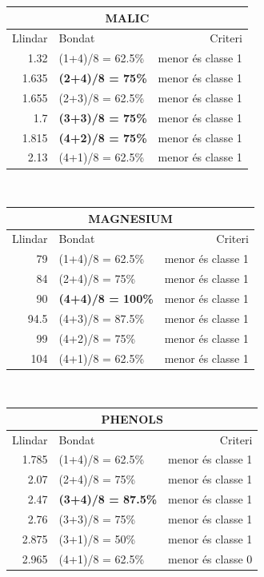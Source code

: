 \documentclass{article} %
\begin{document}
{	{\selectfont\small
	\begin{tabular}{r | l | r}
	 	\multicolumn{3}{c}{MALIC}  \\ \hline
	 	Llindar & Bondat & Criteri \\ \hline
		1.32  & (1+4)/8 = 62.5\% & menor és classe 1 \\
		1.635 & \textbf{(2+4)/8 = 75\%} & menor és classe 1 \\
		1.655 & (2+3)/8 = 62.5\% & menor és classe 1 \\
		1.7   & \textbf{(3+3)/8 = 75\%} & menor és classe 1 \\
		1.815 & \textbf{(4+2)/8 = 75\%} & menor és classe 1 \\
		2.13  & (4+1)/8 = 62.5\% & menor és classe 1 \\
	\end{tabular}
	} \\

	{\selectfont\small
	\begin{tabular}{r | l | r}
	 	\multicolumn{3}{c}{MAGNESIUM}  \\ \hline
	 	Llindar & Bondat & Criteri \\ \hline
		79   & (1+4)/8 = 62.5\% & menor és classe 1 \\
		84   & (2+4)/8 = 75\% & menor és classe 1 \\
		90   & \textbf{(4+4)/8 = 100\%} & menor és classe 1 \\
		94.5 & (4+3)/8 = 87.5\% & menor és classe 1 \\
		99   & (4+2)/8 = 75\% & menor és classe 1 \\
		104  & (4+1)/8 = 62.5\% & menor és classe 1 \\
	\end{tabular}
	} \\

	{\selectfont\small
	\begin{tabular}{r | l | r}
	 	\multicolumn{3}{c}{PHENOLS} \\ \hline
	 	Llindar & Bondat & Criteri \\ \hline
		1.785 & (1+4)/8 = 62.5\% & menor és classe 1 \\
		2.07  & (2+4)/8 = 75\% & menor és classe 1 \\
		2.47  & \textbf{(3+4)/8 = 87.5\%} & menor és classe 1 \\
		2.76  & (3+3)/8 = 75\% & menor és classe 1 \\
		2.875 & (3+1)/8 = 50\% & menor és classe 1 \\
		2.965 & (4+1)/8 = 62.5\% & menor és classe 0 \\
	\end{tabular}
	} \\

}
\end{document}
